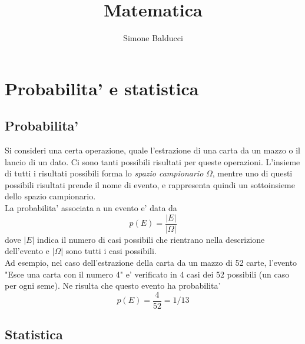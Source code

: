 \documentclass[12pt]{article}
\title{Matematica}
\author{Simone Balducci}
\date{}
\begin{document}
\maketitle
\section{Probabilita' e statistica}
\subsection{Probabilita'}
Si consideri una certa operazione, quale l'estrazione di una carta da un mazzo o il lancio di un dato. Ci sono tanti possibili risultati per queste operazioni. L'insieme di tutti i risultati possibili forma lo \textit{spazio campionario} $\Omega$, mentre uno di questi possibili risultati prende il nome di evento, e rappresenta quindi un sottoinsieme dello spazio campionario. \\
La probabilita' associata a un evento e' data da
$$
	p(E) = \frac{|E|}{|\Omega|}
$$
dove $|E|$ indica il numero di casi possibili che rientrano nella descrizione dell'evento e $|\Omega|$ sono tutti i casi possibili. \\
Ad esempio, nel caso dell'estrazione della carta da un mazzo di 52 carte, l'evento "Esce una carta con il numero 4" e' verificato in 4 casi dei 52 possibili (un caso per ogni seme). Ne risulta che questo evento ha probabilita' 
$$
	p(E) = \frac{4}{52} = 1/13 
$$
\subsection{Statistica}
\end{document}
